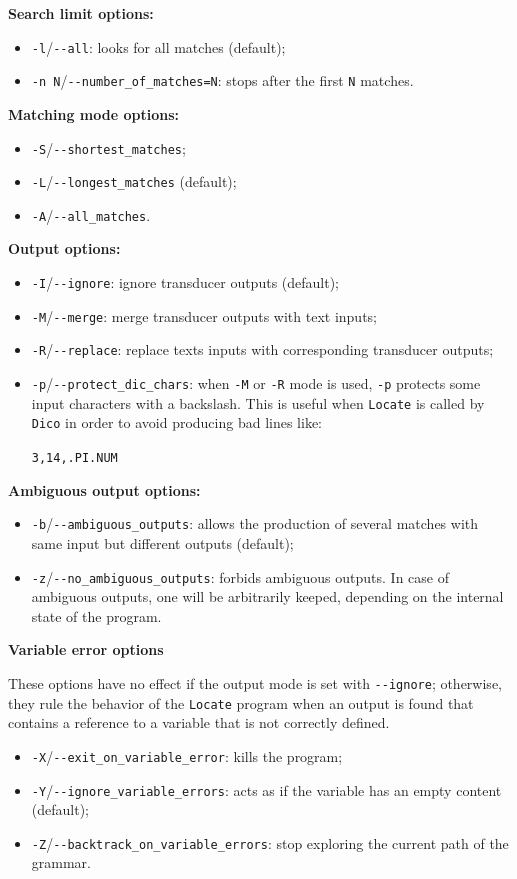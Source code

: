 \bigskip
\noindent \textbf{Search limit options:}
\begin{itemize}
  \item \verb+-l+/\verb+--all+: looks for all matches (default);
  \item \verb+-n N+/\verb+--number_of_matches=N+: stops after the first
  \verb+N+ matches.
\end{itemize}

\bigskip
\noindent \textbf{Matching mode options:}
\begin{itemize}
  \item \verb+-S+/\verb+--shortest_matches+;
  \item \verb+-L+/\verb+--longest_matches+ (default);
  \item \verb+-A+/\verb+--all_matches+.
\end{itemize}

\bigskip
\noindent \textbf{Output options:}
\begin{itemize}
  \item \verb+-I+/\verb+--ignore+: ignore transducer outputs (default);
  \item \verb+-M+/\verb+--merge+: merge transducer outputs with text inputs;
  \item \verb+-R+/\verb+--replace+: replace texts inputs with corresponding
  transducer outputs;
  \item \verb+-p+/\verb+--protect_dic_chars+: when \verb+-M+ or \verb+-R+ mode is
  used, \verb+-p+ protects some input characters with a backslash. This is useful
  when \verb+Locate+ is called by \verb+Dico+ in order to avoid producing bad
  lines like:
  
  \verb+3,14,.PI.NUM+
\end{itemize}

\bigskip
\noindent \textbf{Ambiguous output options:}
\begin{itemize}
  \item \verb+-b+/\verb+--ambiguous_outputs+: allows the production of several 
  matches with same input but different outputs (default);
  \item \verb+-z+/\verb+--no_ambiguous_outputs+: forbids ambiguous outputs. In
  case of ambiguous outputs, one will be arbitrarily keeped, depending on the
  internal state of the program.
\end{itemize}

\bigskip
\noindent \textbf{Variable error options}

\noindent These options have no effect if the output mode is set with
\verb+--ignore+; otherwise, they rule the behavior of the \verb+Locate+ program
when an output is found that contains a reference to a variable that is not correctly defined.
\begin{itemize}
  \item \verb+-X+/\verb+--exit_on_variable_error+: kills the program;
  \item \verb+-Y+/\verb+--ignore_variable_errors+: acts as if the variable has
  an empty content (default);
  \item \verb+-Z+/\verb+--backtrack_on_variable_errors+: stop exploring the
  current path of the grammar.
\end{itemize}
  

